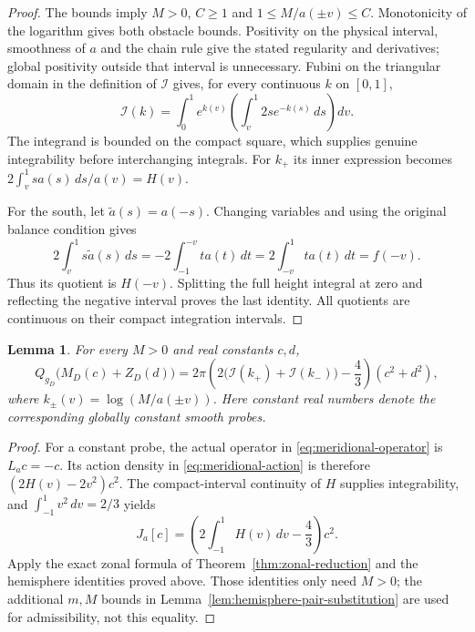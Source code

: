 \documentclass[11pt]{article}
\newtheorem{lemma}[theorem]{Lemma}
\newcommand{\I}{\mathcal I}
\begin{document}
\begin{proof}
The bounds imply $M>0$, $C\geq1$ and $1\leq M/a(\pm v)\leq C$.
Monotonicity of the logarithm gives both obstacle bounds. Positivity on the
physical interval, smoothness of $a$ and the chain rule give the stated
regularity and derivatives; global positivity outside that interval is unnecessary.
Fubini on the triangular domain in the definition of $\I$ gives, for every
continuous $k$ on $[0,1]$,
\[
 \I(k)=\int_0^1 e^{k(v)}
                  \left(\int_v^1 2s e^{-k(s)}\,ds\right)dv .
\]
The integrand is bounded on the compact square, which supplies genuine
integrability before interchanging integrals. For $k_+$ its inner expression
becomes $2\int_v^1s a(s)\,ds/a(v)=H(v)$.

For the south, let $\widetilde a(s)=a(-s)$. Changing variables and using
the original balance condition gives
\[
 2\int_v^1s\widetilde a(s)\,ds
 =-2\int_{-1}^{-v}t a(t)\,dt
 =2\int_{-v}^1t a(t)\,dt=f(-v).
\]
Thus its quotient is $H(-v)$. Splitting the full height integral at zero
and reflecting the negative interval proves the last identity.
All quotients are continuous on their compact integration intervals.
\end{proof}

\begin{lemma}\label{lem:constant-zonal-coefficient}
For every $M>0$ and real constants $c,d$,
\begin{equation}\label{eq:constant-zonal-pair-coefficient}
 Q_{g_D}\bigl(M_D(c)+Z_D(d)\bigr)
 =2\pi\left(2\bigl(\I(k_+)+\I(k_-)\bigr)-\frac43\right)(c^2+d^2),
\end{equation}
where $k_\pm(v)=\log(M/a(\pm v))$. Here constant real numbers denote
the corresponding globally constant smooth probes.
\end{lemma}

\begin{proof}
For a constant probe, the actual operator in
\eqref{eq:meridional-operator} is $L_a c=-c$. Its action density in
\eqref{eq:meridional-action} is therefore $(2H(v)-2v^2)c^2$.
The compact-interval continuity of $H$ supplies integrability, and
$\int_{-1}^1v^2\,dv=2/3$ yields
\[
 J_a[c]=\left(2\int_{-1}^1H(v)\,dv-\frac43\right)c^2.
\]
Apply the exact zonal formula of Theorem~\ref{thm:zonal-reduction} and the
hemisphere identities proved above. Those identities only need $M>0$;
the additional $m,M$ bounds in Lemma~\ref{lem:hemisphere-pair-substitution}
are used for admissibility, not this equality.
\end{proof}
\end{document}
